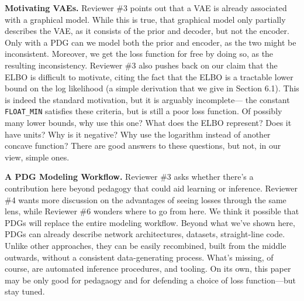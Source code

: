 \documentclass{article}
\theoremstyle{plain}
\theoremstyle{definition}
\begin{document}
\textbf{Motivating VAEs.}
Reviewer \#3 points out that a VAE is already associated with a graphical model.
While this is true, that graphical model only partially describes the VAE, as it consists of the prior and decoder, but not the encoder.
Only with a PDG can we model both the prior and encoder, as the two might be inconsistent.
Moreover, we get the loss function for free by doing so, as the resulting inconsistency.
%
%
Reviewer \#3 also pushes back on our claim that the ELBO is difficult to motivate,
citing
the fact that the ELBO is a tractable lower bound on the log likelihood (a simple derivation that we give in Section 6.1).  This is indeed the standard motivation,
but it is arguably incomplete---%
the constant
\texttt{FLOAT\_MIN}
satisfies these criteria, but is still a poor loss function.
Of possibly many lower bounds, why use this one? What does the ELBO represent? Does it have units? Why is it negative?  Why use the logarithm instead of another concave function?
There are good answers to these questions, but not, in our view, simple ones.



\textbf{A PDG Modeling Workflow.}
Reviewer \#3 asks whether there's a contribution here beyond pedagogy that could aid learning or inference.
Reviewer \#4 wants more discussion on the advantages of seeing losses through the same lens, while Reviewer \#6 wonders where to go from here.
%
We think it possible that PDGs will replace the entire modeling workflow.
Beyond what we've shown here, PDGs can already describe network architectures, datasets, straight-line code.
Unlike other approaches, they can be easily recombined, built from the middle outwards, without a consistent data-generating process.
What's missing, of course, are automated inference procedures, and tooling.
On its own, this paper may be only good for pedagaogy and for defending a choice of loss function---but stay tuned.

\end{document}
